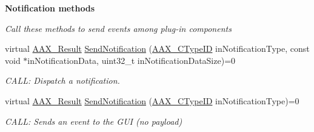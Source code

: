 \begin{Indent}\textbf{ Notification methods}\par
{\em Call these methods to send events among plug-\/in components }\begin{DoxyCompactItemize}
\item 
virtual \mbox{\hyperlink{a00392_a4d8f69a697df7f70c3a8e9b8ee130d2f}{A\+A\+X\+\_\+\+Result}} \mbox{\hyperlink{a01789_a0384f820cecf8cf7671057060bf5ba4f}{Send\+Notification}} (\mbox{\hyperlink{a00392_ac678f9c1fbcc26315d209f71a147a175}{A\+A\+X\+\_\+\+C\+Type\+ID}} in\+Notification\+Type, const void $\ast$in\+Notification\+Data, uint32\+\_\+t in\+Notification\+Data\+Size)=0
\begin{DoxyCompactList}\small\item\em C\+A\+LL\+: Dispatch a notification. \end{DoxyCompactList}\item 
virtual \mbox{\hyperlink{a00392_a4d8f69a697df7f70c3a8e9b8ee130d2f}{A\+A\+X\+\_\+\+Result}} \mbox{\hyperlink{a01789_ad98d549cc7bec4039ce174438d46d5db}{Send\+Notification}} (\mbox{\hyperlink{a00392_ac678f9c1fbcc26315d209f71a147a175}{A\+A\+X\+\_\+\+C\+Type\+ID}} in\+Notification\+Type)=0
\begin{DoxyCompactList}\small\item\em C\+A\+LL\+: Sends an event to the G\+UI (no payload) \end{DoxyCompactList}\end{DoxyCompactItemize}
\end{Indent}
